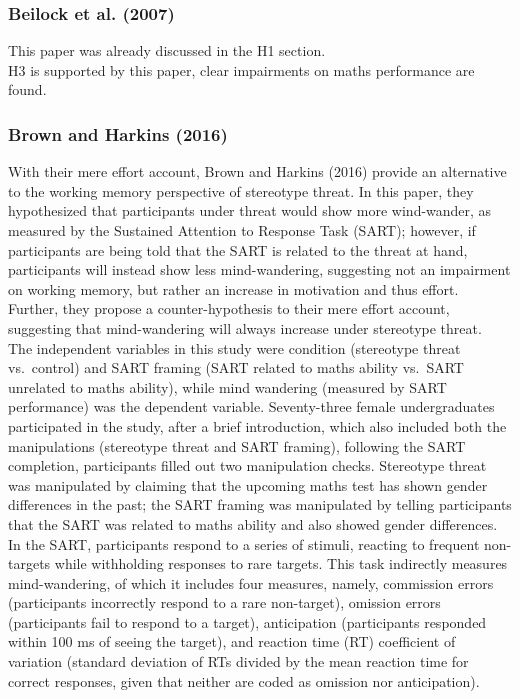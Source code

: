 \documentclass[
  stu,floatsintext]{apa7}
\begin{document}
\subsubsection{Beilock et al. (2007)}\label{beilockstereotypethreatworking2007-1}

This paper was already discussed in the H1 section.\\
H3 is supported by this paper, clear impairments on maths performance are found.

\subsubsection{Brown and Harkins (2016)}\label{brownthreatdoesnot2016}

With their mere effort account, Brown and Harkins (2016) provide an alternative to the working memory perspective of stereotype threat.
In this paper, they hypothesized that participants under threat would show more wind-wander, as measured by the Sustained Attention to Response Task (SART); however, if participants are being told that the SART is related to the threat at hand, participants will instead show less mind-wandering, suggesting not an impairment on working memory, but rather an increase in motivation and thus effort.
Further, they propose a counter-hypothesis to their mere effort account, suggesting that mind-wandering will always increase under stereotype threat.\\
The independent variables in this study were condition (stereotype threat vs.~control) and SART framing (SART related to maths ability vs.~SART unrelated to maths ability), while mind wandering (measured by SART performance) was the dependent variable.
Seventy-three female undergraduates participated in the study, after a brief introduction, which also included both the manipulations (stereotype threat and SART framing), following the SART completion, participants filled out two manipulation checks.
Stereotype threat was manipulated by claiming that the upcoming maths test has shown gender differences in the past; the SART framing was manipulated by telling participants that the SART was related to maths ability and also showed gender differences.
In the SART, participants respond to a series of stimuli, reacting to frequent non-targets while withholding responses to rare targets.
This task indirectly measures mind-wandering, of which it includes four measures, namely, commission errors (participants incorrectly respond to a rare non-target), omission errors (participants fail to respond to a target), anticipation (participants responded within 100 ms of seeing the target), and reaction time (RT) coefficient of variation (standard deviation of RTs divided by the mean reaction time for correct responses, given that neither are coded as omission nor anticipation).
\end{document}
